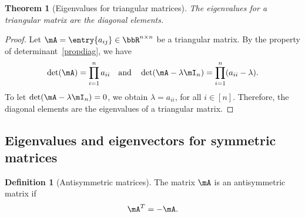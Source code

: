 \documentclass[11pt]{article}
\theoremstyle{plain}
\newtheorem{thm}{Theorem}[section]
\theoremstyle{definition}
\newtheorem{defn}{Definition}
\begin{document}
\begin{thm}[Eigenvalues for triangular matrices]\label{thm:trianeigen}
	The eigenvalues for a triangular matrix are the diagonal elements.
\end{thm}

\begin{proof}
Let $\mA = \entry{a_{ij}} \in \bbR^{n \times n}$ be a triangular matrix. By the property of determinant~\ref{propdiag}, we have
\[ \det(\mA) = \prod_{i=1}^n a_{ii}  \quad \text{and} \quad \det(\mA - \lambda \mI_n) = \prod_{i=1}^n (a_{ii}-\lambda). \]
To let $\det(\mA - \lambda \mI_n) = 0$, we obtain $\lambda = a_{ii}$, for all $ i\in[n]$. Therefore, the diagonal elements are the eigenvalues of a triangular matrix.
\end{proof}


\subsection{Eigenvalues and eigenvectors for symmetric matrices}

\begin{defn}[Antisymmetric matrices]
	The matrix $\mA$ is an antisymmetric matrix if 
	\[\mA^T = - \mA. \] 
\end{defn}
\end{document}
